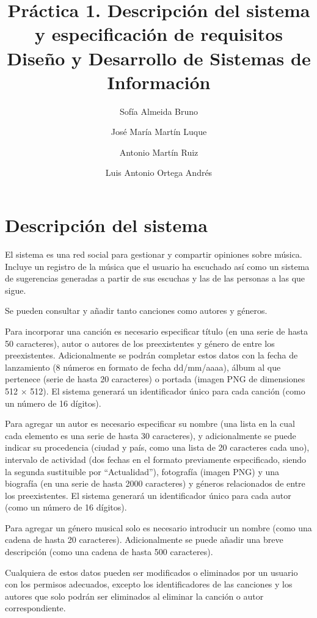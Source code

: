 \documentclass[
  12pt,
  a4paper,
  DIV=12,
  spanish,
]{scrartcl}
\title{Práctica 1. Descripción del sistema y especificación de requisitos \\\large Diseño y Desarrollo de Sistemas de Información}
\author{Sofía Almeida Bruno \and José María Martín Luque \and Antonio Martín Ruiz \and Luis Antonio Ortega Andrés}
\begin{document}
\maketitle

\section{Descripción del sistema} %

El sistema es una red social para gestionar y compartir opiniones sobre música. Incluye un registro de la música que el usuario ha escuchado así como un sistema de sugerencias generadas a partir de sus escuchas y las de las personas a las que sigue.

Se pueden consultar y añadir tanto canciones como autores y géneros.

Para incorporar una canción es necesario especificar título (en una serie de hasta 50 caracteres), autor o autores de los preexistentes y género de entre los preexistentes. Adicionalmente se podrán completar estos datos con la fecha de lanzamiento (8 números en formato de fecha dd/mm/aaaa), álbum al que pertenece (serie de hasta 20 caracteres) o portada (imagen PNG de dimensiones 512 $\times$ 512). El sistema generará un identificador único para cada canción (como un número de 16 dígitos).

Para agregar un autor es necesario especificar su nombre (una lista en la cual cada elemento es una serie de hasta 30 caracteres), y adicionalmente se puede indicar su procedencia (ciudad y país, como una lista de 20 caracteres cada uno), intervalo de actividad (dos fechas en el formato previamente especificado, siendo la segunda sustituible por ``Actualidad''), fotografía (imagen PNG) y una biografía (en una serie de hasta 2000 caracteres) y géneros relacionados de entre los preexistentes. El sistema generará un identificador único para cada autor (como un número de 16 dígitos).

Para agregar un género musical solo es necesario introducir un nombre (como una cadena de hasta 20 caracteres). Adicionalmente se puede añadir una breve descripción (como una cadena de hasta 500 caracteres).

Cualquiera de estos datos pueden ser modificados o eliminados por un usuario con los permisos adecuados, excepto los identificadores de las canciones y los autores que solo podrán ser eliminados al eliminar la canción o autor correspondiente.

\end{document}
